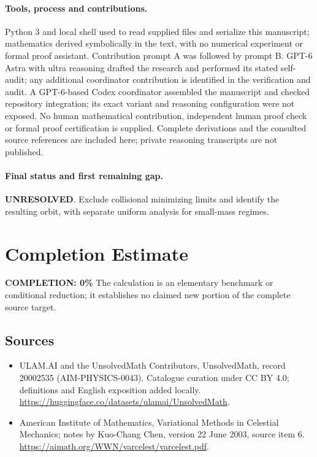 \documentclass[11pt]{article}
\begin{document}
\paragraph{Tools, process and contributions.}
Python 3 and local shell used to read supplied files and serialize this manuscript; mathematics derived symbolically in the text, with no numerical experiment or formal proof assistant. Contribution prompt A was followed by prompt B. GPT-6 Astra with ultra reasoning drafted the research and performed its stated self-audit; any additional coordinator contribution is identified in the verification and audit. A GPT-6-based Codex coordinator assembled the manuscript and checked repository integration; its exact variant and reasoning configuration were not exposed. No human mathematical contribution, independent human proof check or formal proof certification is supplied. Complete derivations and the consulted source references are included here; private reasoning transcripts are not published.

\paragraph{Final status and first remaining gap.}
\textbf{UNRESOLVED}. Exclude collisional minimizing limits and identify the resulting orbit, with separate uniform analysis for small-mass regimes.

\section{Completion Estimate}
\noindent\textbf{COMPLETION: 0\%}
The calculation is an elementary benchmark or conditional reduction; it establishes no claimed new portion of the complete source target.

\subsection{Sources}
\begin{itemize}
\item[\hypertarget{source:20002535:1}{S1}] ULAM.AI and the UnsolvedMath Contributors, UnsolvedMath, record 20002535 (AIM-PHYSICS-0043). Catalogue curation under CC BY 4.0; definitions and English exposition added locally.
\url{https://huggingface.co/datasets/ulamai/UnsolvedMath}.
\item[\hypertarget{source:20002535:2}{S2}] American Institute of Mathematics, Variational Methods in Celestial Mechanics; notes by Kuo-Chang Chen, version 22 June 2003, source item 6.
\url{https://aimath.org/WWN/varcelest/varcelest.pdf}.
\end{itemize}
\label{end:20002535}
\end{document}
